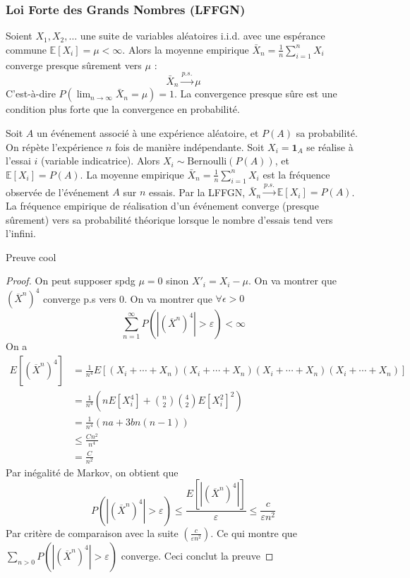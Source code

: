 \subsubsection*{Loi Forte des Grands Nombres (LFFGN)}

Soient $X_1, X_2, \dots$ une suite de variables aléatoires i.i.d. avec une espérance commune $\mathbb{E}[X_i] = \mu < \infty$. Alors la moyenne empirique $\bar{X}_n = \frac{1}{n} \sum_{i=1}^n X_i$ converge presque sûrement vers $\mu$ :
$$\bar{X}_n \xrightarrow{p.s.} \mu$$
C'est-à-dire $P(\lim_{n \to \infty} \bar{X}_n = \mu) = 1$. La convergence presque sûre est une condition plus forte que la convergence en probabilité.

\begin{exemple}
Soit $A$ un événement associé à une expérience aléatoire, et $P(A)$ sa probabilité. On répète l'expérience $n$ fois de manière indépendante. Soit $X_i = \mathbf{1}_A$ se réalise à l'essai $i$ (variable indicatrice). Alors $X_i \sim \text{Bernoulli}(P(A))$, et $\mathbb{E}[X_i] = P(A)$. La moyenne empirique $\bar{X}_n = \frac{1}{n} \sum_{i=1}^n X_i$ est la fréquence observée de l'événement $A$ sur $n$ essais. Par la LFFGN, $\bar{X}_n \xrightarrow{p.s.} \mathbb{E}[X_i] = P(A)$. La fréquence empirique de réalisation d'un événement converge (presque sûrement) vers sa probabilité théorique lorsque le nombre d'essais tend vers l'infini.
\end{exemple}


Preuve cool 
\begin{proof}
    On peut supposer spdg $\mu= 0$ sinon $X'_i= X_i-\mu$. On va montrer que $(\overline{X}^n)^4$ converge p.s vers 0. On va montrer que $\forall \epsilon>0$ 
    \[
    \sum_{n=1}^\infty P(|(\overline{X}^n)^4|>\varepsilon)<\infty
    \]
    On a 
    \begin{align*}
        E[(\overline{X}^n)^4]&= \frac{1}{n^4}E[(X_i+\cdots + X_n)(X_i+\cdots + X_n)(X_i+\cdots + X_n)(X_i+\cdots + X_n)]\\
        &=\frac{1}{n^4}\left(nE[X_i^4]+ {n\choose 2} {4 \choose 2} E[X^2_i]^2\right)\\
        &=\frac{1}{n^4}\left( na+3bn(n-1)\right)\\
        &\le\frac{Cn^2}{n^4}\\
        &=\frac{C}{n^2}  
    \end{align*}
    Par inégalité de Markov, on obtient que 
    \begin{equation*}
        P(|(\overline{X}^n)^4|>\varepsilon)\le \frac{E[|(\overline{X}^n)^4|]}{\varepsilon}\le \frac{c}{\varepsilon n^2}
    \end{equation*}
    Par critère de comparaison avec la suite $\left(\frac{c}{\varepsilon n^2}\right)$. Ce qui montre que $\sum_{n>0}P(|(\overline{X}^n)^4|>\varepsilon)$ converge. Ceci conclut la preuve
\end{proof}

